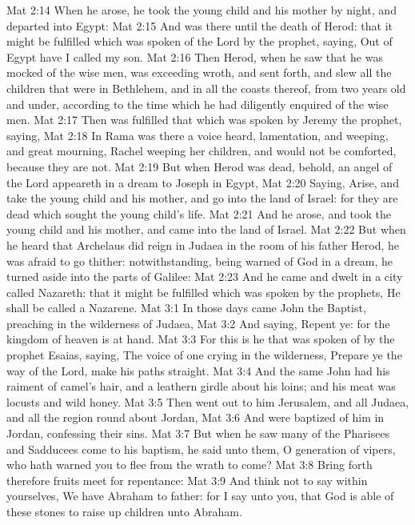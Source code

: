 \vs Mat 2:14 When he arose, he took the young child and his mother by night, and departed into Egypt:
\vs Mat 2:15 And was there until the death of Herod: that it might be fulfilled which was spoken of the Lord by the prophet, saying, Out of Egypt have I called my son.
\vs Mat 2:16 Then Herod, when he saw that he was mocked of the wise men, was exceeding wroth, and sent forth, and slew all the children that were in Bethlehem, and in all the coasts thereof, from two years old and under, according to the time which he had diligently enquired of the wise men.
\vs Mat 2:17 Then was fulfilled that which was spoken by Jeremy the prophet, saying,
\vs Mat 2:18 In Rama was there a voice heard, lamentation, and weeping, and great mourning, Rachel weeping  her children, and would not be comforted, because they are not.
\vs Mat 2:19 But when Herod was dead, behold, an angel of the Lord appeareth in a dream to Joseph in Egypt,
\vs Mat 2:20 Saying, Arise, and take the young child and his mother, and go into the land of Israel: for they are dead which sought the young child's life.
\vs Mat 2:21 And he arose, and took the young child and his mother, and came into the land of Israel.
\vs Mat 2:22 But when he heard that Archelaus did reign in Judaea in the room of his father Herod, he was afraid to go thither: notwithstanding, being warned of God in a dream, he turned aside into the parts of Galilee:
\vs Mat 2:23 And he came and dwelt in a city called Nazareth: that it might be fulfilled which was spoken by the prophets, He shall be called a Nazarene.
\vs Mat 3:1 In those days came John the Baptist, preaching in the wilderness of Judaea,
\vs Mat 3:2 And saying, Repent ye: for the kingdom of heaven is at hand.
\vs Mat 3:3 For this is he that was spoken of by the prophet Esaias, saying, The voice of one crying in the wilderness, Prepare ye the way of the Lord, make his paths straight.
\vs Mat 3:4 And the same John had his raiment of camel's hair, and a leathern girdle about his loins; and his meat was locusts and wild honey.
\vs Mat 3:5 Then went out to him Jerusalem, and all Judaea, and all the region round about Jordan,
\vs Mat 3:6 And were baptized of him in Jordan, confessing their sins.
\vs Mat 3:7 But when he saw many of the Pharisees and Sadducees come to his baptism, he said unto them, O generation of vipers, who hath warned you to flee from the wrath to come?
\vs Mat 3:8 Bring forth therefore fruits meet for repentance:
\vs Mat 3:9 And think not to say within yourselves, We have Abraham to  father: for I say unto you, that God is able of these stones to raise up children unto Abraham.
